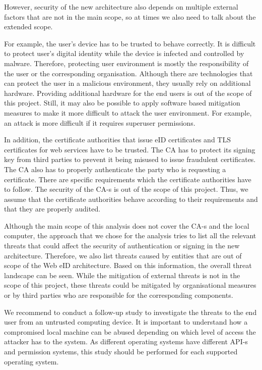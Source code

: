 However, security of the new architecture also depends on multiple external factors that are not in the main scope, so at times we also need to talk about the extended scope.

For example, the user's device has to be trusted to behave correctly. It is difficult to protect user's digital identity while the device is infected and controlled by malware. Therefore, protecting user environment is mostly the responsibility of the user or the corresponding organisation. Although there are technologies that can protect the user in a malicious environment, they usually rely on additional hardware. Providing additional hardware for the end users is out of the scope of this project. Still, it may also be possible to apply software based mitigation measures to make it more difficult to attack the user environment. For example, an attack is more difficult if it requires superuser permissions.

In addition, the certificate authorities that issue eID certificates and TLS certificates for web services have to be trusted. The CA has to protect its signing key from third parties to prevent it being misused to issue fraudulent certificates. The CA also has to properly authenticate the party who is requesting a certificate. There are specific requirements which the certificate authorities have to follow. The security of the CA-s is out of the scope of this project. Thus, we assume that the certificate authorities behave according to their requirements and that they are properly audited.

Although the main scope of this analysis does not cover the CA-s and the local computer, the approach that we chose for the analysis tries to list all the relevant threats that could affect the security of authentication or signing in the new architecture. Therefore, we also list threats caused by entities that are out of scope of the Web eID architecture. Based on this information, the overall threat landscape can be seen. While the mitigation of external threats is not in the scope of this project, these threats could be mitigated by organisational measures or by third parties who are responsible for the corresponding components.

We recommend to conduct a follow-up study to investigate the threats to the end user from an untrusted computing device. It is important to understand how a compromised local machine can be abused depending on which level of access the attacker has to the system. As different operating systems have different API-s and permission systems, this study should be performed for each supported operating system.

